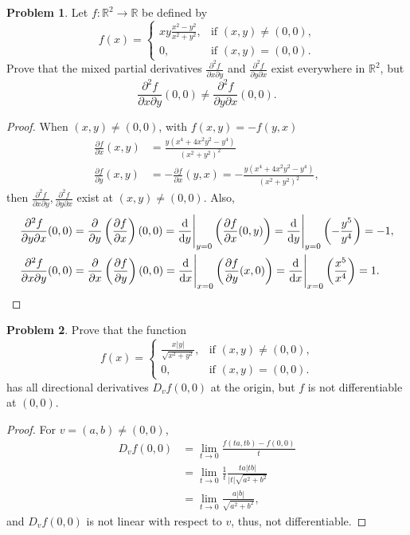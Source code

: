 \documentclass[11pt]{article}
\theoremstyle{definition}
\newtheorem{problem}{Problem}
\theoremstyle{definition}
\begin{document}
\begin{problem}
Let $f:\mathbb{R}^2\to\mathbb{R}$ be defined by
$$
f(x)=
\begin{cases}
xy\frac{x^2-y^2}{x^2+y^2}, & \text{if $(x,y)\neq (0,0)$,}\\
0,                           & \text{if $(x,y)=(0,0)$.}
\end{cases}
$$
Prove that the mixed partial derivatives
$\frac{\partial^2 f}{\partial x\partial y}$ and
$\frac{\partial^2 f}{\partial y\partial x}$
exist everywhere in $\mathbb{R}^2$, but
$$
\frac{\partial^2 f}{\partial x\partial y}(0,0)\neq
\frac{\partial^2 f}{\partial y\partial x}(0,0).
$$
\end{problem}
\begin{proof}
When $(x,y) \neq (0,0)$, with $f(x,y) = - f(y,x)$
\begin{align*}
    \frac{\partial f}{\partial x}(x,y) & = \frac{y(x^4 + 4x^2y^2 - y^4)}{\left(x^2 + y^2\right)^2}\\
    \frac{\partial f}{\partial y}(x,y) & = - \frac{\partial f}{\partial x}(y,x) = - \frac{y(x^4 + 4x^2y^2 - y^4)}{\left(x^2 + y^2\right)^2},
\end{align*}
then $\frac{\partial^2 f}{\partial x\partial y}, \frac{\partial^2 f}{\partial y\partial x}$ exist at $(x,y) \neq (0,0)$. Also, 
\begin{align*}
    \frac{\partial^2 f}{\partial y \partial x}(0,0) & = \frac{\partial}{\partial y}\left(\frac{\partial f}{\partial x}\right)(0,0) = \dv{}{y}\Bigg|_{y=0} \left(\frac{\partial f}{\partial x}(0,y)\right) = \dv{}{y}\Bigg|_{y=0} \left(- \frac{y^5}{y^4}\right) = -1, \\
    \frac{\partial^2 f}{\partial x\partial y}(0,0) & = \frac{\partial}{\partial x}\left(\frac{\partial f}{\partial y}\right)(0,0) = \dv{}{x}\Bigg|_{x=0} \left(\frac{\partial f}{\partial y}(x,0)\right) = \dv{}{x}\Bigg|_{x=0} \left(\frac{x^5}{x^4}\right) = 1.
\end{align*}
\end{proof}

\medskip

\begin{problem}
Prove that the function
$$
f(x)=
\begin{cases}
\frac{x|y|}{\sqrt{x^2+y^2}}, & \text{if $(x,y)\neq (0,0)$,}\\
0,                           & \text{if $(x,y)=(0,0)$.}
\end{cases}
$$
has all directional derivatives $D_vf(0,0)$ at the origin, but $f$ is not differentiable at $(0,0)$.
\end{problem}
\begin{proof}
For $v = (a,b) \neq (0,0)$, 
\begin{align*}
    D_vf(0,0) & = \lim_{t\to 0} \frac{f(ta,tb) - f(0,0)}{t} \\ 
    & = \lim_{t\to 0} \frac{1}{t} \frac{ta|tb|}{|t|\sqrt{a^2+b^2}} \\
    & = \lim_{t\to 0} \frac{a|b|}{\sqrt{a^2+b^2}},
\end{align*}
and $D_vf(0,0)$ is not linear with respect to $v$, thus, not differentiable.
\end{proof}
\end{document}
